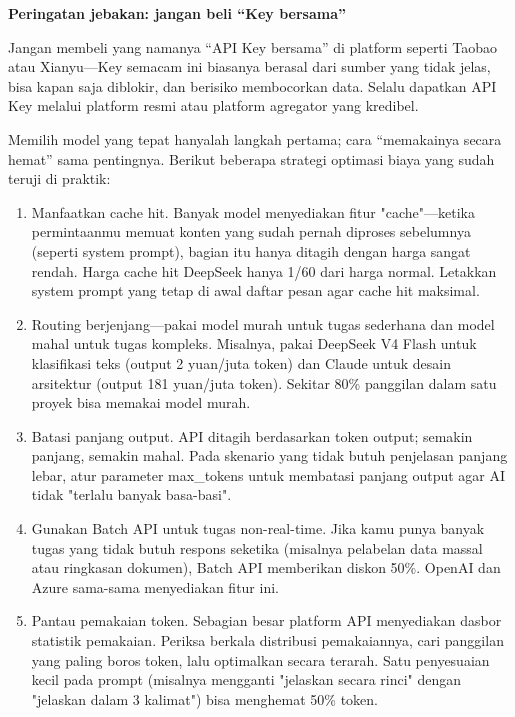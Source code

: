 \textbf{Peringatan jebakan: jangan beli “Key bersama”}\par

Jangan membeli yang namanya “API Key bersama” di platform seperti Taobao atau Xianyu—Key semacam ini biasanya berasal dari sumber yang tidak jelas, bisa kapan saja diblokir, dan berisiko membocorkan data. Selalu dapatkan API Key melalui platform resmi atau platform agregator yang kredibel.


Memilih model yang tepat hanyalah langkah pertama; cara “memakainya secara hemat” sama pentingnya. Berikut beberapa strategi optimasi biaya yang sudah teruji di praktik:

\begin{enumerate}
  \item Manfaatkan cache hit. Banyak model menyediakan fitur "cache"—ketika permintaanmu memuat konten yang sudah pernah diproses sebelumnya (seperti system prompt), bagian itu hanya ditagih dengan harga sangat rendah. Harga cache hit DeepSeek hanya 1/60 dari harga normal. Letakkan system prompt yang tetap di awal daftar pesan agar cache hit maksimal.
  \item Routing berjenjang—pakai model murah untuk tugas sederhana dan model mahal untuk tugas kompleks. Misalnya, pakai DeepSeek V4 Flash untuk klasifikasi teks (output 2 yuan/juta token) dan Claude untuk desain arsitektur (output 181 yuan/juta token). Sekitar 80\% panggilan dalam satu proyek bisa memakai model murah.
  \item Batasi panjang output. API ditagih berdasarkan token output; semakin panjang, semakin mahal. Pada skenario yang tidak butuh penjelasan panjang lebar, atur parameter max\_tokens untuk membatasi panjang output agar AI tidak "terlalu banyak basa-basi".
  \item Gunakan Batch API untuk tugas non-real-time. Jika kamu punya banyak tugas yang tidak butuh respons seketika (misalnya pelabelan data massal atau ringkasan dokumen), Batch API memberikan diskon 50\%. OpenAI dan Azure sama-sama menyediakan fitur ini.
  \item Pantau pemakaian token. Sebagian besar platform API menyediakan dasbor statistik pemakaian. Periksa berkala distribusi pemakaiannya, cari panggilan yang paling boros token, lalu optimalkan secara terarah. Satu penyesuaian kecil pada prompt (misalnya mengganti "jelaskan secara rinci" dengan "jelaskan dalam 3 kalimat") bisa menghemat 50\% token.
\end{enumerate}

